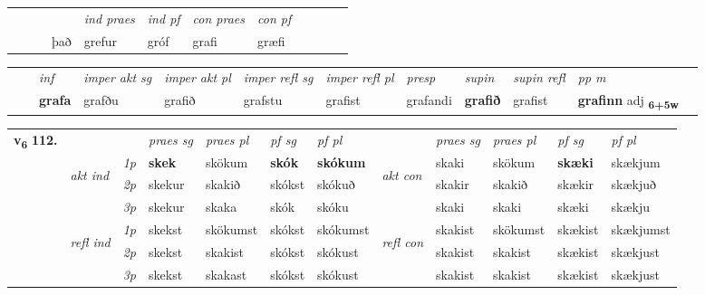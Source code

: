 \begin{tabular}{llllllllllll}
 & &  & &  \textit{ind praes} & \textit{ind pf} & \textit{con praes} & \textit{con pf} \\*
&  & & það & grefur & gróf & grafi & græfi \\*
\cmidrule{5-9}
\end{tabular}


\begin{tabular}{llllllllllll}
 & & \textit{inf} & \textit{imper akt sg} & \textit{imper akt pl} & \textit{imper refl sg} & \textit{imper refl pl} & \textit{presp} & \textit{supin} & \textit{supin refl} & \textit{pp m}     \\*
  & & \textbf{grafa} & grafðu  & grafið & grafstu & grafist & grafandi &  \textbf{grafið} & grafist & \textbf{grafinn} adj \textbf{\textsubscript{6+5w}} \\*
\cmidrule{1-12}
\end{tabular}



\begin{tabular}{llllllllllll} \toprule
\multirow{4}{*}{{{\textbf{v{\textsubscript{6}}} \Large{\textbf{112.}}}}}  & &   &  \textit{praes sg}  & \textit{praes pl}  &\textit{ pf sg} & \textit{pf pl} &  &  \textit{praes sg}  & \textit{praes pl}  & \textit{pf sg} & \textit{pf pl } \\*
	\cmidrule{4-7} \cmidrule{9-12}
 & \multirow{3}{*}{\begin{turn}{90}\textit{akt ind}\end{turn}} & {\textit{1p}} & \textbf{skek} & skökum    & \textbf{skók} & \textbf{skókum} & \multirow{3}{*}{\begin{turn}{90}\textit{akt con}\end{turn}} &skaki & skökum & \textbf{skæki} & skækjum\\*
& &  {\textit{2p}} &  skekur  & skakið   & skókst & skókuð & & skakir & skakið & skækir & skækjuð \\*
& &  {\textit{3p}} & skekur & skaka   & skók & skóku & & skaki & skaki& skæki & skækju  \\*
\cmidrule{4-7} \cmidrule{9-12}
 &\multirow{3}{*}{\begin{turn}{90}\textit{refl ind}\end{turn}} & {\textit{1p}} & skekst & skökumst    & skókst & skókumst & \multirow{3}{*}{\begin{turn}{90}\textit{refl con}\end{turn}}  &skakist & skökumst & skækist & skækjumst\\*
 &&  {\textit{2p}} &  skekst  & skakist   & skókst & skókust & &skakist & skakist & skækist & skækjust \\*
& &  {\textit{3p}} & skekst & skakast   & skókst & skókust & & skakist & skakist& skækist & skækjust  \\*
\cmidrule{4-7} \cmidrule{9-12}
\end{tabular}


